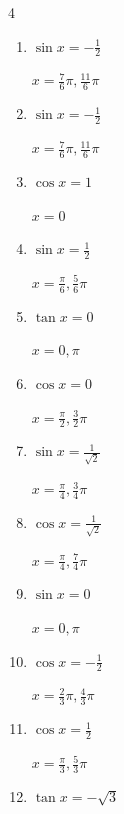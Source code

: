 \begin{multicols}{4}
\begin{enumerate}
        $\displaystyle x = \frac{2}{3}\pi , \frac{5}{3}\pi$

  \item $\displaystyle \sin{x}  = -\frac{1}{2}$

        $\displaystyle x = \frac{7}{6}\pi , \frac{11}{6}\pi$

  \item $\displaystyle \sin{x}  = -\frac{1}{2}$

        $\displaystyle x = \frac{7}{6}\pi , \frac{11}{6}\pi$

  \item $\displaystyle \cos{x}  = 1$

        $\displaystyle x = 0$

  \item $\displaystyle \sin{x}  = \frac{1}{2}$

        $\displaystyle x = \frac{\pi}{6} , \frac{5}{6}\pi$

  \item $\displaystyle \tan{x}  = 0$

        $\displaystyle x = 0 , \pi$

  \item $\displaystyle \cos{x}  = 0$

        $\displaystyle x = \frac{\pi}{2} , \frac{3}{2}\pi$

  \item $\displaystyle \sin{x}  = \frac{1}{\sqrt{2}}$

        $\displaystyle x = \frac{\pi}{4} , \frac{3}{4}\pi$

  \item $\displaystyle \cos{x}  = \frac{1}{\sqrt{2}}$

        $\displaystyle x = \frac{\pi}{4} , \frac{7}{4}\pi$

  \item $\displaystyle \sin{x}  = 0$

        $\displaystyle x = 0 , \pi$

  \item $\displaystyle \cos{x}  = -\frac{1}{2}$

        $\displaystyle x = \frac{2}{3}\pi , \frac{4}{3}\pi$

\columnbreak %

  \item $\displaystyle \cos{x}  = \frac{1}{2}$

        $\displaystyle x = \frac{\pi}{3} , \frac{5}{3}\pi$

  \item $\displaystyle \tan{x}  = -\sqrt{3}$


\end{enumerate}
\end{multicols}
